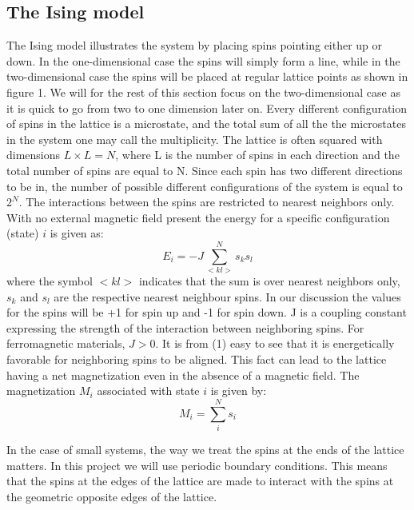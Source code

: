 \documentclass[a4paper,12pt]{article}
\begin{document}
\subsection{The Ising model}
The Ising model illustrates the system by placing spins pointing either up or down. In the one-dimensional case the spins will simply form a line, while in the two-dimensional case the spins will be placed at regular lattice points as shown in figure 1. We will for the rest of this section focus on the two-dimensional case as it is quick to go from two to one dimension later on. Every different configuration of spins in the lattice is a microstate, and  the total sum of all the the microstates in the system one may call the multiplicity. The lattice is often squared with dimensions $L \times L = N$, where L is the number of spins in each direction and the total number of spins are equal to N. Since each spin has two different directions to be in, the number of possible different configurations of the system is equal to $2^N$. The interactions between the spins are restricted to nearest neighbors only.\newline
With no external magnetic field present the energy for a specific configuration (state) $i$ is given as:
\begin{equation}
    E_i = -J \sum_{<kl>}^{N} s_k s_l
\end{equation}
where the symbol $<kl>$ indicates that the sum is over nearest neighbors only, $s_k$ and $s_l$ are the respective nearest neighbour spins. In our discussion the values for the spins will be +1 for spin up and -1 for spin down. J is a coupling constant expressing the strength of the interaction between neighboring spins. For ferromagnetic materials, $J > 0$. It is from (1) easy to see that it is energetically favorable for neighboring spins to be aligned. This fact can lead to the lattice having a net magnetization even in the absence of a magnetic field.\newline
The magnetization $M_i$ associated with state $i$ is given by:
\begin{equation}
    M_i = \sum_{i}^{N}s_i
\end{equation}

In the case of small systems, the way we treat the spins at the ends of the lattice matters. In this project we will use periodic boundary conditions. This means that the spins at the edges of the lattice are made to interact with the spins at the geometric opposite edges of the lattice.\newline
\end{document}
